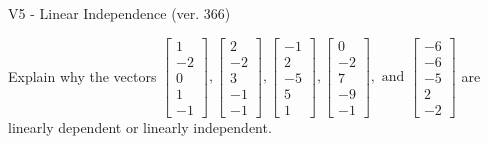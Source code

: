 \begin{exercise}
  \begin{exerciseTitle}V5 - Linear Independence (ver. 366)\end{exerciseTitle}
  \begin{exerciseStatement}
    Explain why the vectors \(\left[\begin{array}{r}
1 \\
-2 \\
0 \\
1 \\
-1
\end{array}\right] , \left[\begin{array}{r}
2 \\
-2 \\
3 \\
-1 \\
-1
\end{array}\right] , \left[\begin{array}{r}
-1 \\
2 \\
-5 \\
5 \\
1
\end{array}\right] , \left[\begin{array}{r}
0 \\
-2 \\
7 \\
-9 \\
-1
\end{array}\right] , \text{ and } \left[\begin{array}{r}
-6 \\
-6 \\
-5 \\
2 \\
-2
\end{array}\right]\) are linearly dependent or linearly independent.	



\end{exerciseStatement}
\end{exercise}
